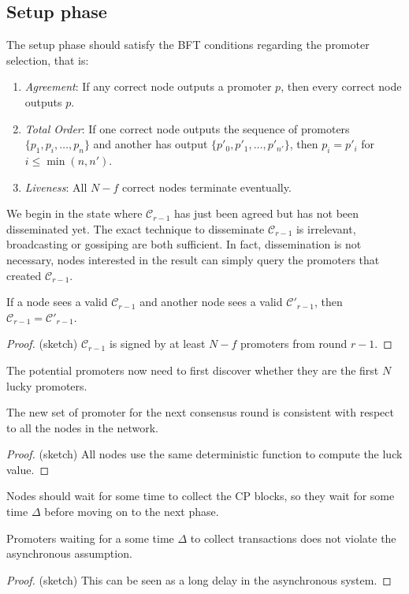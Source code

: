 \subsection{Setup phase}
The setup phase should satisfy the BFT conditions regarding the promoter
selection, that is:
\begin{enumerate}
\item \emph{Agreement}: If any correct node outputs a promoter $p$, then every
  correct node outputs $p$.
\item \emph{Total Order}: If one correct node outputs the sequence of promoters
  $\{p_1, p_i, \dots, p_n\}$ and another has output $\{p'_0, p'_1, \dots,
  p'_{n'} \}$, then $p_i = p'_i$ for $i \le \min(n, n')$.
\item \emph{Liveness}: All $N - f$ correct nodes terminate eventually.
\end{enumerate}

We begin in the state where $\mathcal{C}_{r-1}$ has just been agreed but has not
been disseminated yet. The exact technique to disseminate $\mathcal{C}_{r-1}$ is
irrelevant, broadcasting or gossiping are both sufficient. In fact,
dissemination is not necessary, nodes interested in the result can simply query
the promoters that created $\mathcal{C}_{r-1}$.

\begin{lemma}
  If a node sees a valid $\mathcal{C}_{r-1}$ and another node sees a valid
  $\mathcal{C}'_{r-1}$, then $\mathcal{C}_{r-1} = \mathcal{C}'_{r-1}$.
\end{lemma}
\begin{proof}
  (sketch) $\mathcal{C}_{r-1}$ is signed by at least $N-f$ promoters from round
  $r-1$.
\end{proof}

The potential promoters now need to first discover whether
they are the first $N$ lucky promoters.

\begin{lemma}
  The new set of promoter for the next consensus round is consistent with
  respect to all the nodes in the network.
\end{lemma}
\begin{proof}
  (sketch) All nodes use the same deterministic function to compute the luck
  value.
\end{proof}

Nodes should wait for some time to collect the CP blocks, so they wait for some
time $\Delta$ before moving on to the next phase.

\begin{lemma}
  Promoters waiting for a some time $\Delta$ to collect transactions does not
  violate the asynchronous assumption.
\end{lemma}
\begin{proof}
  (sketch) This can be seen as a long delay in the asynchronous system.
\end{proof}

